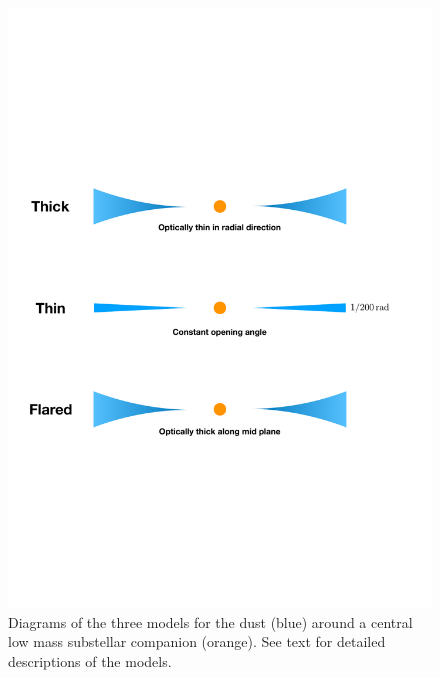 \documentclass{aa} %
\begin{document}
\begin{figure}[tbh]
\begin{center}
\includegraphics[width=\columnwidth]{model_sketch.pdf}
\caption{\label{fig:diskmodels}Diagrams of the three models for the dust (blue) around a central low mass substellar companion (orange). See text for detailed descriptions of the models.}

\end{center}
\end{figure}%
\end{document}
